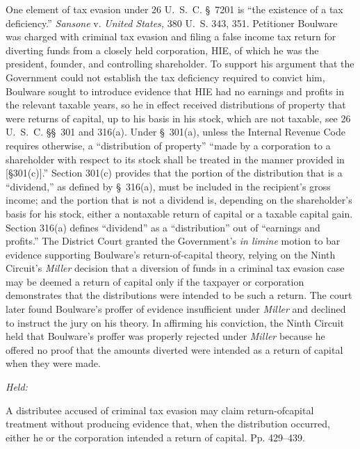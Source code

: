 
\setcounter{page}{421}

  One element of tax evasion under 26 U.~S.~C. \S~7201 is ``the
existence of a tax deficiency.'' \emph{Sansone} v. \emph{United States,}
380 U.~S. 343, 351. Petitioner Boulware was charged with criminal
tax evasion and filing a false income tax return for diverting funds
from a closely held corporation, HIE, of which he was the president,
founder, and controlling shareholder. To support his argument that
the Government could not establish the tax deficiency required to
convict him, Boulware sought to introduce evidence that HIE had no
earnings and profits in the relevant taxable years, so he in effect
received distributions of property that were returns of capital, up
to his basis in his stock, which are not taxable, see 26 U.~S.~C.
\S\S~301 and 316(a). Under \S~301(a), unless the Internal Revenue
Code requires otherwise, a ``distribution of property'' ``made
by a corporation to a shareholder with respect to its stock shall
be treated in the manner provided in [\S301(c)].'' Section 301(c)
provides that the portion of the distribution that is a ``dividend,''
as defined by \S~316(a), must be included in the recipient's gross
income; and the portion that is not a dividend is, depending on the
shareholder's basis for his stock, either a nontaxable return of
capital or a taxable capital gain. Section 316(a) defines ``dividend''
as a ``distribution'' out of ``earnings and profits.'' The District
Court granted the Government's \emph{in limine} motion to bar evidence
supporting Boulware's return-of-capital theory, relying on the Ninth
Circuit's \emph{Miller} decision that a diversion of funds in a criminal
tax evasion case may be deemed a return of capital only if the taxpayer
or corporation demonstrates that the distributions were intended to be
such a return. The court later found Boulware's proffer of evidence
insufficient under \emph{Miller} and declined to instruct the jury on
his theory. In affirming his conviction, the Ninth Circuit held that
Boulware's proffer was properly rejected under \emph{Miller} because he
offered no proof that the amounts diverted were intended as a return of
capital when they were made.

\emph{Held:}

  A distributee accused of criminal tax evasion may claim
return-ofcapital treatment without producing evidence that, when the
distribution occurred, either he or the corporation intended a return of
capital. Pp. 429--439. \newpage 

